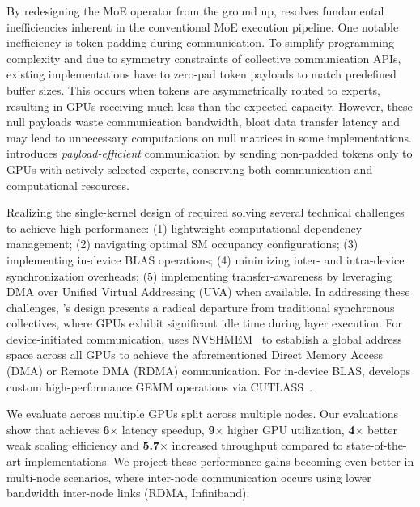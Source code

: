 By redesigning the MoE operator from the ground up,
\sysname resolves fundamental inefficiencies inherent in the conventional MoE execution pipeline.
One notable inefficiency is token padding during communication.
To simplify programming complexity and due to symmetry constraints of collective communication APIs,
existing implementations have to zero-pad token payloads to match predefined buffer sizes.
This occurs when tokens are asymmetrically routed to experts, resulting in GPUs receiving much less than the expected
capacity.
However, these null payloads waste communication bandwidth, bloat data transfer latency and may lead to
unnecessary computations on null matrices in some implementations.
\sysname introduces \emph{payload-efficient} communication by sending non-padded tokens only to
GPUs with actively selected experts, conserving both communication and computational resources.

Realizing the single-kernel design of \sysname required
solving several technical challenges to achieve high performance:
(1) lightweight computational dependency management; (2)
navigating optimal SM occupancy configurations; (3) implementing in-device BLAS operations;
(4) minimizing inter- and intra-device synchronization overheads; (5) implementing transfer-awareness by leveraging
DMA over Unified Virtual Addressing (UVA) when available.
In addressing these challenges, \sysname's design presents a
radical departure from traditional synchronous \alltoall collectives,
where GPUs exhibit significant idle time during layer execution.
For device-initiated communication,
\sysname uses NVSHMEM~\cite{nvshm} to establish a global address space across all GPUs to
achieve the aforementioned Direct Memory Access (DMA) or Remote DMA (RDMA) communication.
For in-device BLAS, \sysname develops custom high-performance GEMM operations via CUTLASS~\cite{Thakkar_CUTLASS_2023}.

We evaluate \sysname across multiple GPUs split across multiple nodes.
Our evaluations show that \sysname achieves \textbf{6}$\times$ latency speedup,
\textbf{9}$\times$ higher GPU utilization, \textbf{4}$\times$ better weak scaling efficiency and \textbf{5.7}$\times$
increased throughput compared to state-of-the-art implementations.
We project these performance gains becoming even better in multi-node scenarios,
where inter-node communication occurs using lower bandwidth inter-node links (\eg RDMA, Infiniband).
